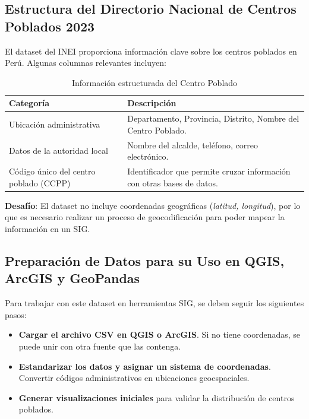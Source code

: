 \documentclass{article}
\begin{document}
\begin{itemize}
	\subsection*{Estructura del Directorio Nacional de Centros Poblados 2023}
	El dataset del INEI proporciona información clave sobre los centros poblados en Perú. Algunas columnas relevantes incluyen:
	
	\begin{table}[H]
		\centering
		\renewcommand{\arraystretch}{1.5}
		\begin{tabularx}{\textwidth}{|l|X|}
			\hline
			\textbf{Categoría} & \textbf{Descripción} \\
			\hline
			Ubicación administrativa & Departamento, Provincia, Distrito, Nombre del Centro Poblado. \\
			\hline
			Datos de la autoridad local & Nombre del alcalde, teléfono, correo electrónico. \\
			\hline
			Código único del centro poblado (CCPP) & Identificador que permite cruzar información con otras bases de datos. \\
			\hline
		\end{tabularx}
		\caption{Información estructurada del Centro Poblado}
		\label{tabla:centro_poblado}
	\end{table}
	
	
	\textbf{Desafío}:  
	El dataset no incluye coordenadas geográficas (\textit{latitud, longitud}), por lo que es necesario realizar un proceso de geocodificación para poder mapear la información en un SIG.
	
	\subsection*{Preparación de Datos para su Uso en QGIS, ArcGIS y GeoPandas}
	Para trabajar con este dataset en herramientas SIG, se deben seguir los siguientes pasos:
	
	\begin{itemize}
		\item \textbf{Cargar el archivo CSV en QGIS o ArcGIS}. Si no tiene coordenadas, se puede unir con otra fuente que las contenga.
		\item \textbf{Estandarizar los datos y asignar un sistema de coordenadas}. Convertir códigos administrativos en ubicaciones geoespaciales.
		\item \textbf{Generar visualizaciones iniciales} para validar la distribución de centros poblados.
	\end{itemize}
	

\end{itemize}
\end{document}
